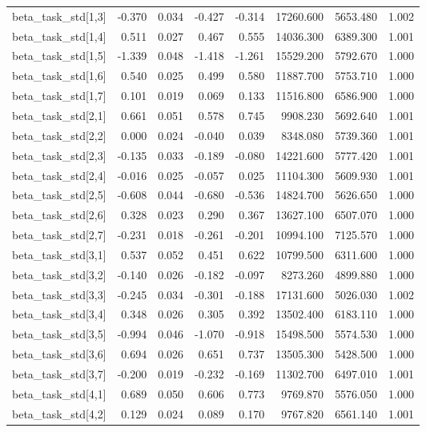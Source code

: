 \begin{tabular}{lrrrrrrr}
beta\_task\_std[1,3] & -0.370 & 0.034 & -0.427 & -0.314 & 17260.600 & 5653.480 & 1.002 \\
beta\_task\_std[1,4] & 0.511 & 0.027 & 0.467 & 0.555 & 14036.300 & 6389.300 & 1.001 \\
beta\_task\_std[1,5] & -1.339 & 0.048 & -1.418 & -1.261 & 15529.200 & 5792.670 & 1.000 \\
beta\_task\_std[1,6] & 0.540 & 0.025 & 0.499 & 0.580 & 11887.700 & 5753.710 & 1.000 \\
beta\_task\_std[1,7] & 0.101 & 0.019 & 0.069 & 0.133 & 11516.800 & 6586.900 & 1.000 \\
beta\_task\_std[2,1] & 0.661 & 0.051 & 0.578 & 0.745 & 9908.230 & 5692.640 & 1.001 \\
beta\_task\_std[2,2] & 0.000 & 0.024 & -0.040 & 0.039 & 8348.080 & 5739.360 & 1.001 \\
beta\_task\_std[2,3] & -0.135 & 0.033 & -0.189 & -0.080 & 14221.600 & 5777.420 & 1.001 \\
beta\_task\_std[2,4] & -0.016 & 0.025 & -0.057 & 0.025 & 11104.300 & 5609.930 & 1.001 \\
beta\_task\_std[2,5] & -0.608 & 0.044 & -0.680 & -0.536 & 14824.700 & 5626.650 & 1.000 \\
beta\_task\_std[2,6] & 0.328 & 0.023 & 0.290 & 0.367 & 13627.100 & 6507.070 & 1.000 \\
beta\_task\_std[2,7] & -0.231 & 0.018 & -0.261 & -0.201 & 10994.100 & 7125.570 & 1.000 \\
beta\_task\_std[3,1] & 0.537 & 0.052 & 0.451 & 0.622 & 10799.500 & 6311.600 & 1.000 \\
beta\_task\_std[3,2] & -0.140 & 0.026 & -0.182 & -0.097 & 8273.260 & 4899.880 & 1.000 \\
beta\_task\_std[3,3] & -0.245 & 0.034 & -0.301 & -0.188 & 17131.600 & 5026.030 & 1.002 \\
beta\_task\_std[3,4] & 0.348 & 0.026 & 0.305 & 0.392 & 13502.400 & 6183.110 & 1.000 \\
beta\_task\_std[3,5] & -0.994 & 0.046 & -1.070 & -0.918 & 15498.500 & 5574.530 & 1.000 \\
beta\_task\_std[3,6] & 0.694 & 0.026 & 0.651 & 0.737 & 13505.300 & 5428.500 & 1.000 \\
beta\_task\_std[3,7] & -0.200 & 0.019 & -0.232 & -0.169 & 11302.700 & 6497.010 & 1.001 \\
beta\_task\_std[4,1] & 0.689 & 0.050 & 0.606 & 0.773 & 9769.870 & 5576.050 & 1.000 \\
beta\_task\_std[4,2] & 0.129 & 0.024 & 0.089 & 0.170 & 9767.820 & 6561.140 & 1.001 \\

\end{tabular}

